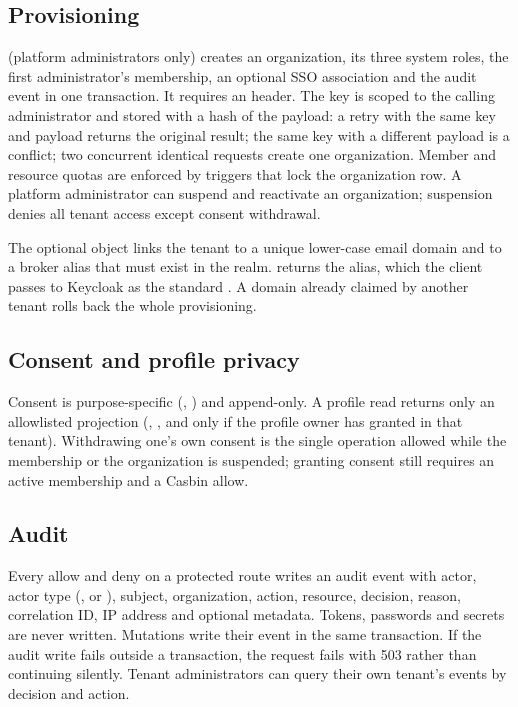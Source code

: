 \subsection{Provisioning}
 (platform administrators only) creates an organization, its three system roles, the first administrator's membership, an optional SSO association and the audit event in one transaction. It requires an  header. The key is scoped to the calling administrator and stored with a hash of the payload: a retry with the same key and payload returns the original result; the same key with a different payload is a conflict; two concurrent identical requests create one organization. Member and resource quotas are enforced by triggers that lock the organization row. A platform administrator can suspend and reactivate an organization; suspension denies all tenant access except consent withdrawal.

The optional  object links the tenant to a unique lower-case email domain and to a broker alias that must exist in the realm.  returns the alias, which the client passes to Keycloak as the standard . A domain already claimed by another tenant rolls back the whole provisioning.

\subsection{Consent and profile privacy}
Consent is purpose-specific (, ) and append-only. A profile read returns only an allowlisted projection (, , and  only if the profile owner has granted  in that tenant). Withdrawing one's own consent is the single operation allowed while the membership or the organization is suspended; granting consent still requires an active membership and a Casbin allow.

\subsection{Audit}
Every allow and deny on a protected route writes an audit event with actor, actor type (,  or ), subject, organization, action, resource, decision, reason, correlation ID, IP address and optional metadata. Tokens, passwords and secrets are never written. Mutations write their event in the same transaction. If the audit write fails outside a transaction, the request fails with 503 rather than continuing silently. Tenant administrators can query their own tenant's events by decision and action.

